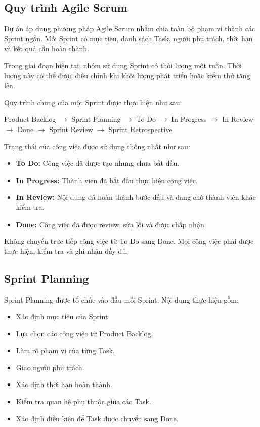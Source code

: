 \subsection{Quy trình Agile Scrum}

Dự án áp dụng phương pháp Agile Scrum nhằm chia toàn bộ phạm vi thành
các Sprint ngắn. Mỗi Sprint có mục tiêu, danh sách Task, người phụ trách,
thời hạn và kết quả cần hoàn thành.

Trong giai đoạn hiện tại, nhóm sử dụng Sprint có thời lượng một tuần.
Thời lượng này có thể được điều chỉnh khi khối lượng phát triển hoặc
kiểm thử tăng lên.

Quy trình chung của một Sprint được thực hiện như sau:

\begin{center}
	Product Backlog
	$\rightarrow$ Sprint Planning
	$\rightarrow$ To Do
	$\rightarrow$ In Progress
	$\rightarrow$ In Review
	$\rightarrow$ Done
	$\rightarrow$ Sprint Review
	$\rightarrow$ Sprint Retrospective
\end{center}

Trạng thái của công việc được sử dụng thống nhất như sau:

\begin{itemize}
	\item \textbf{To Do:} Công việc đã được tạo nhưng chưa bắt đầu.
	
	\item \textbf{In Progress:} Thành viên đã bắt đầu thực hiện công việc.
	
	\item \textbf{In Review:} Nội dung đã hoàn thành bước đầu và đang chờ
	thành viên khác kiểm tra.
	
	\item \textbf{Done:} Công việc đã được review, sửa lỗi và được chấp nhận.
\end{itemize}

Không chuyển trực tiếp công việc từ To Do sang Done. Mọi công việc phải
được thực hiện, kiểm tra và ghi nhận đầy đủ.

\subsection{Sprint Planning}

Sprint Planning được tổ chức vào đầu mỗi Sprint. Nội dung thực hiện gồm:

\begin{itemize}
	\item Xác định mục tiêu của Sprint.
	\item Lựa chọn các công việc từ Product Backlog.
	\item Làm rõ phạm vi của từng Task.
	\item Giao người phụ trách.
	\item Xác định thời hạn hoàn thành.
	\item Kiểm tra quan hệ phụ thuộc giữa các Task.
	\item Xác định điều kiện để Task được chuyển sang Done.
\end{itemize}

